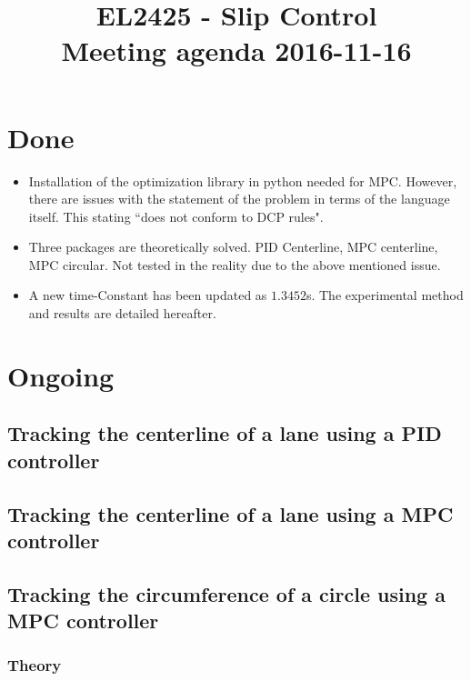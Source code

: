\documentclass[oneside,12pt]{article}
\title{EL2425 - Slip Control \\ Meeting agenda 2016-11-16}
\begin{document}
\maketitle

\section{Done}

\begin{itemize}
  \item Installation of the optimization library in python needed for MPC.
    However, there are issues with the statement of the problem in terms of the
    language itself. This stating ``does not conform to DCP rules".

    \item Three packages are theoretically solved. PID Centerline,
      MPC centerline, MPC circular. Not tested in the reality due to the
      above mentioned issue.

    \item A new time-Constant has been updated as $1.3452$s. The experimental
      method and results are detailed hereafter.
\end{itemize}



\section{Ongoing}

  \subsection{Tracking the centerline of a lane using a PID controller}

    

  \subsection{Tracking the centerline of a lane using a MPC controller}

    


  \subsection{Tracking the circumference of a circle using a MPC controller}

    \subsubsection{Theory}
      
\end{document}
